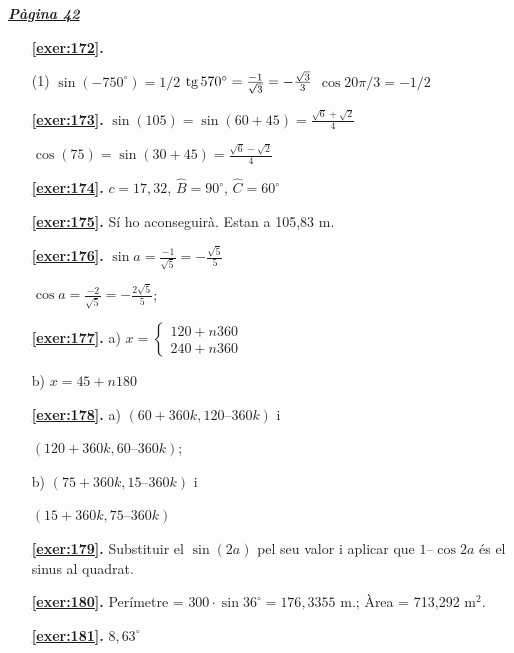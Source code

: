 \hyperlink{page.42}{\textbf{\em Pàgina 42}}
\begin{enumerate}



 \item[\fontfamily{phv}\selectfont\color{blue}\textbf{\ref{exer:172}. }] \label{ans:172}
 \begin{tasks}[column-sep=1em, item-indent=1.3333em](1)
	 \task $\sin (-750^\circ )=1/2$
	 \task* $\mathrm{tg}\, 570^\circ =\frac {-1}{\sqrt 3}=-\frac {\sqrt 3}{3}$
	 \task $\cos 20\pi /3 = -1/2$
\end{tasks}
 \end{enumerate}
\begin{enumerate}
\item[\fontfamily{phv}\selectfont\color{blue}\textbf{\ref{exer:173}. }] \label{ans:173} 
$\sin (105)=\sin (60+45)=\frac {\sqrt {6}+\sqrt {2}}{4}$ \par $\cos (75)=\sin (30+45)=\frac {\sqrt {6}-\sqrt {2}}{4}$
\item[\fontfamily{phv}\selectfont\color{blue}\textbf{\ref{exer:174}. }] \label{ans:174} 
$c=17,32$, $\hat B=90^\circ $, $\hat C=60^\circ $
\item[\fontfamily{phv}\selectfont\color{blue}\textbf{\ref{exer:175}. }] \label{ans:175} 
Sí ho aconseguirà. Estan a 105,83 m.
\item[\fontfamily{phv}\selectfont\color{blue}\textbf{\ref{exer:176}. }] \label{ans:176} 
$\sin a=\frac {-1}{\sqrt 5}=-\frac {\sqrt 5}{5}$\par $\cos a=\frac {-2}{\sqrt 5}=-\frac {2\sqrt 5}{5}$;
\item[\fontfamily{phv}\selectfont\color{blue}\textbf{\ref{exer:177}. }] \label{ans:177} 
a) $x=\left \{\begin {array}{l} 120 + n 360 \\ 240 +n 360 \end {array}\right .$ \par b) $x=45 + n 180$
\item[\fontfamily{phv}\selectfont\color{blue}\textbf{\ref{exer:178}. }] \label{ans:178} 
a) $(60+360k,120–360k)$ i \par $(120+360k,60–360k)$; \par b) $(75+360k, 15–360k)$ i \par $(15+360k, 75–360k)$
\item[\fontfamily{phv}\selectfont\color{blue}\textbf{\ref{exer:179}. }] \label{ans:179} 
Substituir el $\sin (2a)$ pel seu valor i aplicar que $1–\cos 2a$ és el sinus al quadrat.
\item[\fontfamily{phv}\selectfont\color{blue}\textbf{\ref{exer:180}. }] \label{ans:180} 
Perímetre = $300\cdot \sin 36^\circ = 176,3355$ m.; \quad Àrea = 713,292 m$^2$.
\item[\fontfamily{phv}\selectfont\color{blue}\textbf{\ref{exer:181}. }] \label{ans:181} 
$8,63^\circ $
 \end{enumerate}


